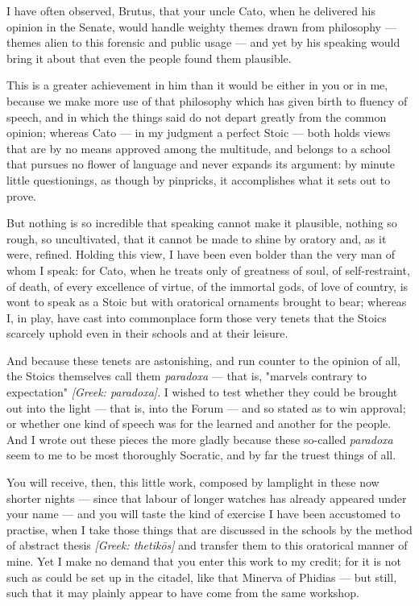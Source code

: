 
 I have often observed, Brutus, that your uncle Cato, when he delivered his opinion in the Senate, would handle weighty themes drawn from philosophy — themes alien to this forensic and public usage — and yet by his speaking would bring it about that even the people found them plausible.

 This is a greater achievement in him than it would be either in you or in me, because we make more use of that philosophy which has given birth to fluency of speech, and in which the things said do not depart greatly from the common opinion; whereas Cato — in my judgment a perfect Stoic — both holds views that are by no means approved among the multitude, and belongs to a school that pursues no flower of language and never expands its argument: by minute little questionings, as though by pinpricks, it accomplishes what it sets out to prove.

 But nothing is so incredible that speaking cannot make it plausible, nothing so rough, so uncultivated, that it cannot be made to shine by oratory and, as it were, refined. Holding this view, I have been even bolder than the very man of whom I speak: for Cato, when he treats only of greatness of soul, of self-restraint, of death, of every excellence of virtue, of the immortal gods, of love of country, is wont to speak as a Stoic but with oratorical ornaments brought to bear; whereas I, in play, have cast into commonplace form those very tenets that the Stoics scarcely uphold even in their schools and at their leisure.

 And because these tenets are astonishing, and run counter to the opinion of all, the Stoics themselves call them \textit{paradoxa} — that is, "marvels contrary to expectation" \textit{[Greek: paradoxa]}. I wished to test whether they could be brought out into the light — that is, into the Forum — and so stated as to win approval; or whether one kind of speech was for the learned and another for the people. And I wrote out these pieces the more gladly because these so-called \textit{paradoxa} seem to me to be most thoroughly Socratic, and by far the truest things of all.

 You will receive, then, this little work, composed by lamplight in these now shorter nights — since that labour of longer watches has already appeared under your name — and you will taste the kind of exercise I have been accustomed to practise, when I take those things that are discussed in the schools by the method of abstract thesis \textit{[Greek: thetikōs]} and transfer them to this oratorical manner of mine. Yet I make no demand that you enter this work to my credit; for it is not such as could be set up in the citadel, like that Minerva of Phidias — but still, such that it may plainly appear to have come from the same workshop.

